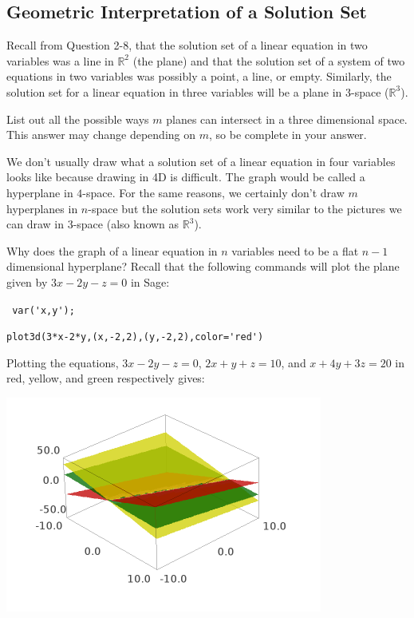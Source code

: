 \subsection{Geometric Interpretation of a Solution Set}

Recall from Question 2-8, that the solution set of a linear equation in two variables was a line in $\mathbb{R}^2$ (the plane) and that the solution set of a system of two equations in two variables was possibly a point, a line, or empty. Similarly, the solution set for a linear equation in three variables will be a plane in 3-space ($\mathbb{R}^3$).

\begin{question} List out all the possible ways $m$ planes can intersect in a three dimensional space. This answer may change depending on $m$, so be complete in your answer. \end{question}

We don't usually draw what a solution set of a linear equation in four variables looks like because drawing in 4D is difficult. The graph would be called a hyperplane in $4$-space. For the same reasons, we certainly don't draw $m$ hyperplanes in $n$-space but the solution sets work very similar to the pictures we can draw in 3-space (also known as $\mathbb{R}^3$).

\bq Why does the graph of a linear equation in $n$ variables need to be a flat $n-1$ dimensional hyperplane?
\eq
Recall that the following commands will plot the plane given by $3x-2y-z=0$ in Sage:

\verb" var('x,y'); "

\verb"plot3d(3*x-2*y,(x,-2,2),(y,-2,2),color='red') "

Plotting the equations, $3x-2y-z=0$, $2x+y+z=10$, and $x+4y+3z=20$ in red, yellow, and green respectively gives:

\begin{center}\includegraphics[scale=1.5]{3planeplot.png}\end{center}

